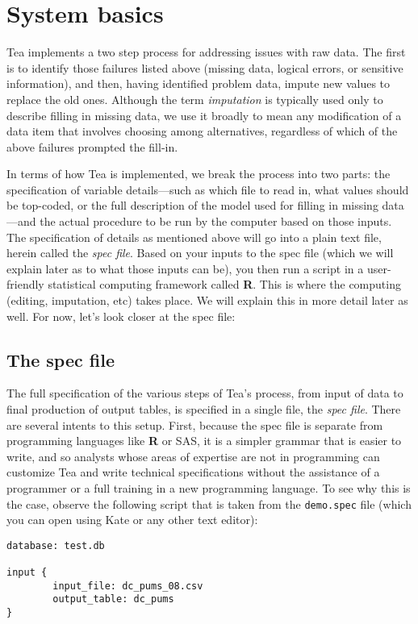 \documentclass{article}
\begin{document}
\section{System basics}
Tea implements a two step process for addressing issues with raw data. The first is to
identify those failures listed above (missing data, logical errors, or sensitive
information), and then, having identified problem data, impute new values
to replace the old ones. Although the term {\em imputation} is typically used only to 
describe filling in missing data, we use it broadly to mean any modification of a 
data item that involves choosing among alternatives, regardless of which of the 
above failures prompted the fill-in. 

In terms of how Tea is implemented, we break the process into two parts: the 
specification of variable details---such as which file to read in, what values should 
be top-coded, or the full description of the model used for filling in missing 
data---and the actual procedure to be run by the computer based on those inputs. 
The specification of details as mentioned above will go into a plain text file, 
herein called the {\em spec file}. Based on your inputs to the spec file 
(which we will explain later as to what those inputs can be), you then run 
a script in a user-friendly statistical computing framework called {\bf R}. This is 
where the computing (editing, imputation, etc) takes place. We will explain this in 
more detail later as well. For now, let's look closer at the spec file: 

\subsection{The spec file}\label{specsec}
The full specification of the various steps of Tea's process, from input of data to final 
production of output tables, 
is specified in a single file, the {\em spec file}. There are several intents to 
this setup. First, because the spec file is separate from programming languages like
\textbf{R} or SAS, it is a simpler grammar that is easier to write, and so analysts
whose areas of expertise are not in programming can customize Tea and write technical
specifications without the assistance of a programmer or a full training in a new
programming language. To see why this is the case, observe the following script that
is taken from the {\tt demo.spec} file (which you can open using Kate or any other
text editor):

\begin{verbatim}
database: test.db

input {
        input_file: dc_pums_08.csv
        output_table: dc_pums
}
\end{verbatim}
\end{document}
